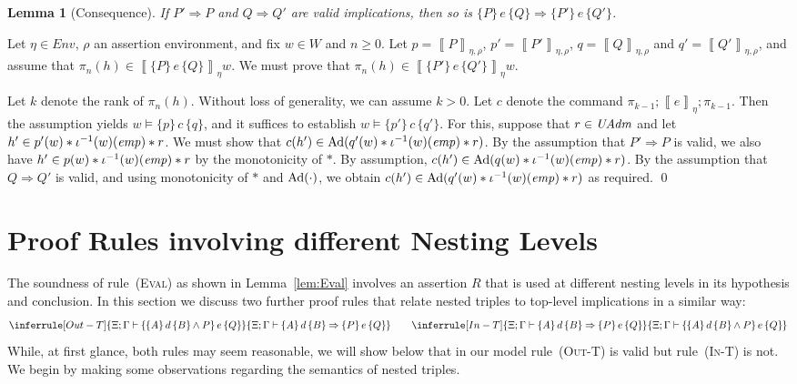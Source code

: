\documentclass{LMCS}
\newtheorem{lemma}[theorem]{Lemma}
\theoremstyle{remark}
\newcommand{\Env}{\ensuremath{\textit{Env}}\xspace}
\newcommand{\triple}[3]{{\ensuremath{\!\left.\{ #1 \}\, #2\, \{  #3 \}\!\right.}}}
\newcommand{\wemp}{\textnormal{\textit{emp}}}
\newcommand{\den}[1]{\left\llbracket #1
  \right\rrbracket}
\newcommand{\W}{\ensuremath{W}}
\newcommand{\UNFOLD}{\ensuremath{\iota^{-1}}}
\newcommand{\X}{\ensuremath{\Xi}}
\begin{document}
\begin{lemma}[Consequence]
If $P'\Rightarrow P$ and $Q\Rightarrow Q'$ are valid implications, 
then so is $\triple{P}{e}{Q}\Rightarrow\triple{P'}{e}{Q'}$. 
\end{lemma}

\proof
Let $\eta\in\Env$, $\rho$ an assertion environment,  and fix $w\in\W$ and $n\geq 0$. 
Let $p = \den{P}_{\eta,\rho}$, $p' = \den{P'}_{\eta,\rho}$, $q = \den{Q}_{\eta,\rho}$ and $q' = \den{Q'}_{\eta,\rho}$, and assume that $\pi_n(h)\in\den{\triple{P}{e}{Q}}_\eta w$.
We must prove that $\pi_n(h)\in\den{\triple{P'}{e}{Q'}}_\eta w$. 


Let $k$ denote the rank of $\pi_n(h)$. Without loss of generality, we can assume $k>0$. Let
$c$ denote the command $\pi_{k-1};\den{e}_\eta;\pi_{k-1}$. 
Then the assumption yields 
$w\models \triple{p}{c}{q}$, 
and it suffices to establish  $w\models \triple{p'}{c}{q'}$.
For this, suppose that $r\in\mathit{UAdm}$ and let $h'\in p'(w) * \UNFOLD(w)(\wemp) * r$. 
We must show that $c(h')\in \DCl(q'(w) * \UNFOLD(w)(\wemp) * r)$. 
By the assumption that $P'\Rightarrow P$ is valid, we also have $h'\in p(w) * \UNFOLD(w)(\wemp) * r$ by the monotonicity of $*$. 
By assumption, $c(h')\in \DCl(q(w) * \UNFOLD(w)(\wemp) * r)$. 
By the assumption that $Q\Rightarrow Q'$ is valid, and using monotonicity of $*$ and $\mathrm{Ad}(\cdot)$, we obtain 
$c(h')\in \DCl(q'(w) * \UNFOLD(w)(\wemp) * r)$
as required.  \qed




\section{Proof Rules involving different Nesting Levels}
\label{sec:discussion-of-proof-rules}

The soundness of rule~(\textsc{Eval}) as shown in Lemma~\ref{lem:Eval}
involves an assertion $R$ that is used at different nesting levels in its hypothesis and conclusion. 
In this section we discuss two further proof rules that relate nested triples to top-level implications in a similar way:
\begin{align*}
\inferrule[Out-T]{ 
\X;\Gamma \adash \triple{ \triple{A}{d}{B} \wedge P}{e}{Q}}
{ \X;\Gamma \adash \triple{A}{d}{B} \Rightarrow \triple{ P} {e} {Q}
}
\qquad 
 \inferrule[In-T]{ 
 \X;\Gamma \adash \triple{A}{d}{B} \Rightarrow \triple{P} {e} {Q}
}
{\X;\Gamma \adash \triple{ \triple{A}{d}{B} \wedge P}{e}{Q}}
 \end{align*}
While, at first glance, both rules may seem reasonable, we will show below that in our model rule~(\textsc{Out-T}) is valid
but   rule~(\textsc{In-T}) is not. 
We begin by making some observations regarding the semantics of nested triples.
\end{document}

